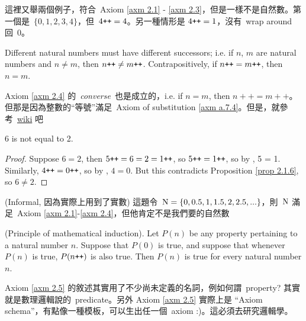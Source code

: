 \begin{example}\label{example 2.1.7}
這裡又舉兩個例子，符合\ Axiom \ref{axm 2.1} - \ref{axm 2.3}，但是一樣不是自然數。第一個是\ \(\{0,1,2,3,4\}\)，但\ \(4\texttt{++} = 4\)。另一種情形是 \(4\texttt{++} = 1\)，沒有\ wrap around 回\ 0。
\end{example}

\begin{axiom}\label{axm 2.4}
Different natural numbers must have different successors; i.e. if \(n\), \(m\) are natural numbers and \(n \neq m\), then \(n\texttt{++} \neq m\texttt{++}\). Contrapositively, if \(n\texttt{++} = m\texttt{++}\), then \(n = m\).
\end{axiom}

\begin{note}
Axiom \ref{axm 2.4} 的\ \emph{converse}\ 也是成立的，i.e. if \(n = m\), then \(n++ = m++\)。但那是因為整數的``等號''滿足\ Axiom of substitution \ref{axm a.7.4}。但是，就參考\ \href{https://www.wikiwand.com/en/Peano_axioms#/Formulation}{wiki} 吧
\end{note}

\begin{proposition}\label{prop 2.1.8}
6 is not equal to 2.
\end{proposition}
\begin{proof}
Suppose \( 6 = 2 \), then \( 5\texttt{++} = 6 = 2 = 1\texttt{++} \), so \(5\texttt{++} = 1\texttt{++} \), so by , 5 = 1. Similarly, \(4\texttt{++} = 0\texttt{++}\), so by , \(4 = 0\). But this contradicts Proposition \ref{prop 2.1.6}, so \(6 \neq 2\).
\end{proof}

\begin{example}\label{example 2.1.9}(Informal, 因為實際上用到了實數)
這題令\ \( \textup{N} = \{0, 0.5, 1, 1.5, 2, 2.5, ...\}\)，則\ \(\textup{N}\) 滿足\ Axiom \ref{axm 2.1}-\ref{axm 2.4}，但他肯定不是我們要的自然數
\end{example}

\begin{axiom}\label{axm 2.5} (Principle of mathematical induction). Let \(P(n)\) be any property pertaining to a natural number \(n\). Suppose that \(P(0)\) is true, and suppose that whenever \(P(n)\) is true, \(P(n\texttt{++})\) is also true. Then \(P(n)\) is true for every natural number \(n\).
\end{axiom}

\begin{remark}\label{rmk 2.1.10} Axiom \ref{axm 2.5} 的敘述其實用了不少尚未定義的名詞，例如何謂\ property? 其實就是數理邏輯說的\ predicate。另外 Axiom \ref{axm 2.5} 實際上是 ``Axiom schema''，有點像一種模板，可以生出任一個\  axiom :)。這必須去研究邏輯學。
\end{remark}

